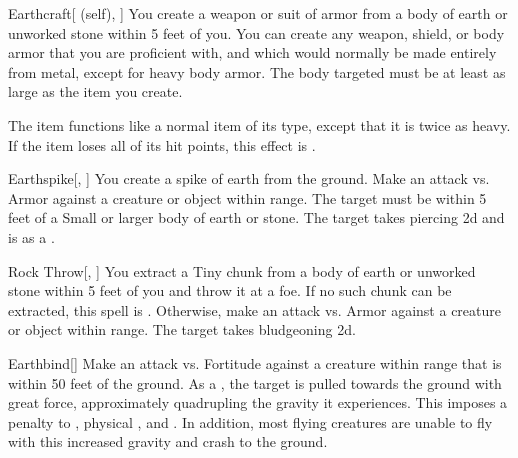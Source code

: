 \lowercase{\hypertarget{spell:Earthcraft}{}}\label{spell:Earthcraft}
\begin{ability}[\nth{1}]{\hypertarget{spell:Earthcraft}{Earthcraft}}[ (self), ]
You create a weapon or suit of armor from a body of earth or unworked stone within 5 feet of you.
You can create any weapon, shield, or body armor that you are proficient with, and which would normally be made entirely from metal, except for heavy body armor.
The body targeted must be at least as large as the item you create.

The item functions like a normal item of its type, except that it is twice as heavy.
If the item loses all of its hit points, this effect is .
\end{ability}
\vspace{0.25em}



\lowercase{\hypertarget{spell:Earthspike}{}}\label{spell:Earthspike}
\begin{ability}[\nth{1}]{\hypertarget{spell:Earthspike}{Earthspike}}[, ]
You create a spike of earth from the ground.
Make an attack vs. Armor against a creature or object within \rngclose range.
The target must be within 5 feet of a Small or larger body of earth or stone.
\hit The target takes piercing  \plus2d and is  as a .
\end{ability}
\vspace{0.25em}



\lowercase{\hypertarget{spell:Rock Throw}{}}\label{spell:Rock Throw}
\begin{ability}[\nth{1}]{\hypertarget{spell:Rock Throw}{Rock Throw}}[, ]
You extract a Tiny chunk from a body of earth or unworked stone within 5 feet of you and throw it at a foe.
If no such chunk can be extracted, this spell is .
Otherwise, make an attack vs. Armor against a creature or object within \rngmed range.
\hit The target takes bludgeoning  \plus2d.
\end{ability}
\vspace{0.25em}



\lowercase{\hypertarget{spell:Earthbind}{}}\label{spell:Earthbind}
\begin{ability}[\nth{2}]{\hypertarget{spell:Earthbind}{Earthbind}}[]
Make an attack vs. Fortitude against a creature within \rngmed range that is within 50 feet of the ground.
\hit As a , the target is pulled towards the ground with great force, approximately quadrupling the gravity it experiences.
This imposes a  penalty to , physical , and .
In addition, most flying creatures are unable to fly with this increased gravity and crash to the ground.
\end{ability}
\vspace{0.25em}



